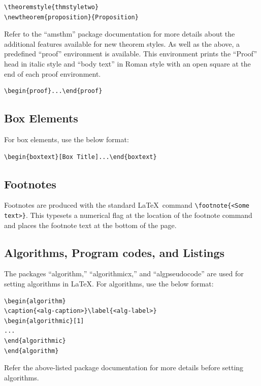 \documentclass{article}
\begin{document}
\begin{verbatim}
\theoremstyle{thmstyletwo}
\newtheorem{proposition}{Proposition}
\end{verbatim}

Refer to the ``amsthm'' package documentation for more details about the additional features available for new theorem styles. As well as the above, a predefined ``proof'' environment is available. This environment prints the ``Proof'' head in italic style and ``body text'' in Roman style with an open square at the end of each proof environment.

\begin{verbatim}
\begin{proof}...\end{proof}
\end{verbatim}

\subsection{Box Elements}

For box elements, use the below format:

\begin{verbatim}
\begin{boxtext}[Box Title]...\end{boxtext}
\end{verbatim}

\subsection{Footnotes}

Footnotes are produced with the standard \LaTeX\ command \verb+\footnote{<Some text>}+. This typesets a numerical flag at the location of the footnote command and places the footnote text at the bottom of the page.

\subsection{Algorithms, Program codes, and Listings}

The packages ``algorithm,'' ``algorithmicx,'' and ``algpseudocode'' are used for setting algorithms in \LaTeX. For algorithms, use the below format:

\begin{verbatim}
\begin{algorithm}
\caption{<alg-caption>}\label{<alg-label>}
\begin{algorithmic}[1]
...
\end{algorithmic}
\end{algorithm}
\end{verbatim}
Refer the above-listed package documentation for more details before setting algorithms.
\end{document}
